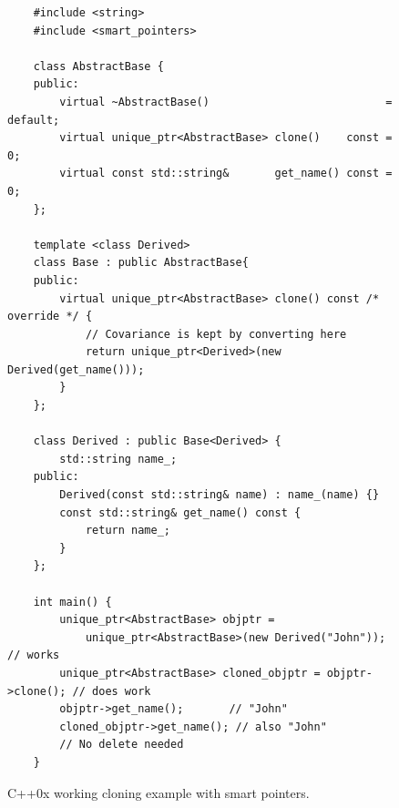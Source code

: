 \begin{figure}[tbh]
  \centering
  \begin{verbatim}
    #include <string>
    #include <smart_pointers>
    
    class AbstractBase {
    public:
        virtual ~AbstractBase()                           = default;
        virtual unique_ptr<AbstractBase> clone()    const = 0;
        virtual const std::string&       get_name() const = 0;
    };
    
    template <class Derived>
    class Base : public AbstractBase{
    public:
        virtual unique_ptr<AbstractBase> clone() const /* override */ {
            // Covariance is kept by converting here
            return unique_ptr<Derived>(new Derived(get_name()));
        }
    };
    
    class Derived : public Base<Derived> {
        std::string name_;
    public:
        Derived(const std::string& name) : name_(name) {}
        const std::string& get_name() const {
            return name_;
        }
    };
    
    int main() {
        unique_ptr<AbstractBase> objptr =
            unique_ptr<AbstractBase>(new Derived("John"));        // works
        unique_ptr<AbstractBase> cloned_objptr = objptr->clone(); // does work
        objptr->get_name();       // "John"
        cloned_objptr->get_name(); // also "John"
        // No delete needed
    }
  \end{verbatim}
  \caption{C++0x working cloning example with smart pointers.}
  \label{code:gen.crtp.final}
\end{figure}

